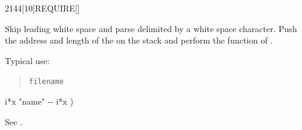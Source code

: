 \begin{worddef}{2144}[10]{REQUIRE}[]%
\item {}

	Skip leading white space and parse  delimited by a
	white space character. Push the address and length of the
	 on the stack and perform the function of
	.


	\begin{rationale} %
		Typical use:
		\begin{quote}
			 \texttt{filename}
		\end{quote}
	\end{rationale}

	\begin{implement} %
		\word{:}   i*x "name" -{}- i*x ) \\
		\tab {}  \word{;}
	\end{implement}

	\begin{testing} %
		See .
	\end{testing}
\end{worddef}

